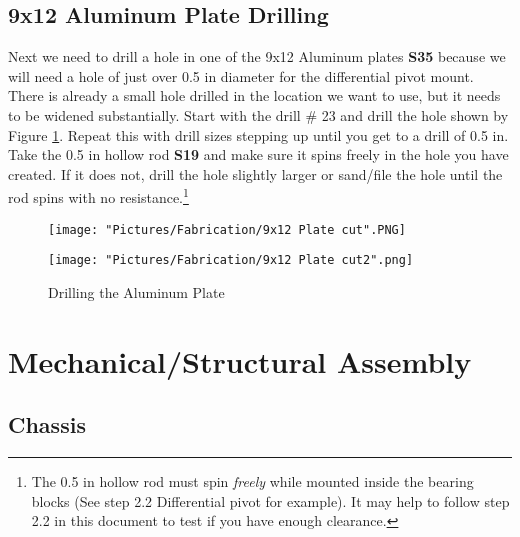 \documentclass[12pt]{article}
\begin{document}
\subsection{9x12 Aluminum Plate Drilling}
Next we need to drill a hole in one of the 9x12 Aluminum plates \textbf{S35} because we will need a hole of just over 0.5 in diameter for the differential pivot mount. There is already a small hole drilled in the location we want to use, but it needs to be widened substantially. Start with the drill \# 23 and drill the hole shown by Figure \ref{Drilling the Al plate}. Repeat this with drill sizes stepping up until you get to a drill of 0.5 in. Take the 0.5 in hollow rod \textbf{S19} and make sure it spins freely in the hole you have created. If it does not, drill the hole slightly larger or sand/file the hole until the rod spins with no resistance.\footnote{The 0.5 in hollow rod must spin \textit{freely} while mounted inside the bearing blocks (See step 2.2 Differential pivot for example). It may help to follow step 2.2 in this document to test if you have enough clearance.}

\begin{figure}[H]
  \centering
  \begin{minipage}[b]{0.45\textwidth}
    \texttt{[image: "Pictures/Fabrication/9x12 Plate cut".PNG]}
  \end{minipage}
  \hfill
  \begin{minipage}[b]{0.45\textwidth}
    \texttt{[image: "Pictures/Fabrication/9x12 Plate cut2".png]}
  \end{minipage}
  \caption{Drilling the Aluminum Plate}
  \label{Drilling the Al plate}
\end{figure}

\newpage

\section{Mechanical/Structural Assembly}
\subsection{Chassis}
\end{document}

